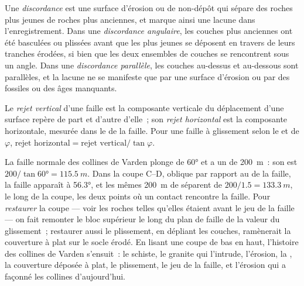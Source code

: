 \begin{definition}\label{def:b1:cross-sections:unconformity}
Une \emph{discordance} est une surface d'érosion ou de non-dépôt qui sépare des roches
plus jeunes de roches plus anciennes, et marque ainsi une lacune dans
l'enregistrement. Dans une \emph{discordance angulaire},
les couches plus anciennes ont été basculées ou plissées avant que les plus
jeunes se déposent en travers de leurs tranches érodées, si bien que les deux
ensembles de couches se rencontrent sous un angle. Dans une
\emph{discordance parallèle}, les couches au-dessus et au-dessous sont parallèles, et la
lacune ne se manifeste que par une surface d'érosion ou par des fossiles ou des
âges manquants.
\end{definition}

\begin{definition}\label{def:b1:cross-sections:throw}
Le \emph{rejet vertical} d'une faille est la composante verticale du déplacement d'une
surface repère de part et d'autre d'elle~; son \emph{rejet
horizontal} est la composante horizontale, mesurée dans le
 de la faille. Pour une faille à glissement selon le  et
de  $\varphi$, $\text{rejet horizontal} = \text{rejet vertical}/\tan\varphi$.
\end{definition}

La faille normale des collines de Varden plonge de \ang{60} et a un  de \qty{200}{m}~: son  est
$200/\tan\ang{60} = \qty{115.5}{m}$. Dans la coupe C--D, oblique par rapport au
 de la faille, la faille apparaît à \ang{56.3}, et les mêmes
\qty{200}{m} de  séparent de $200/1.5 = \qty{133.3}{m}$, le long de
la coupe, les deux points où un contact rencontre la faille. Pour
\emph{restaurer} la coupe --- voir les roches telles qu'elles étaient avant le
jeu de la faille --- on fait remonter le bloc supérieur le long du plan de
faille de la valeur du glissement~; restaurer aussi le plissement, en dépliant
les couches, ramènerait la couverture à plat sur le socle érodé. En lisant une
coupe de bas en haut, l'histoire des collines de Varden s'ensuit~: le schiste, le
granite qui l'intrude, l'érosion, la , la couverture
déposée à plat, le plissement, le jeu de la faille, et l'érosion qui a façonné
les collines d'aujourd'hui.

